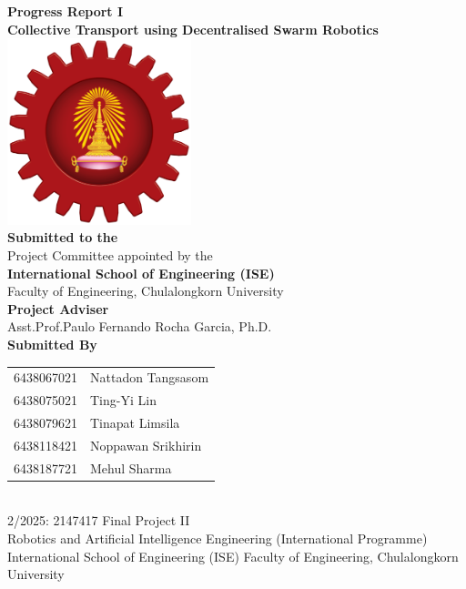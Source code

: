 \begin{titlepage}
    \centering

    {\LARGE \textbf{Progress Report I}}\\[1cm]
    {\Huge \textbf{Collective Transport using Decentralised Swarm Robotics}}\\[1cm]

    \includegraphics[width=0.4\textwidth]{assets/images/ise_logo.png}\\[1cm]
    
    \textbf{Submitted to the}\\[0.1cm]
    Project Committee appointed by the\\
    \textbf{International School of Engineering (ISE)}\\
    Faculty of Engineering, Chulalongkorn University\\[1cm]

    \textbf{Project Adviser}\\[0.1cm]
    Asst.Prof.Paulo Fernando Rocha Garcia, Ph.D.\\[1cm]

    \textbf{Submitted By}\\[0.5cm]
    \begin{tabular}{rl}
        6438067021 & Nattadon Tangsasom \\
        6438075021 & Ting-Yi Lin \\
        6438079621 & Tinapat Limsila \\
        6438118421 & Noppawan Srikhirin \\
        6438187721 & Mehul Sharma \\
    \end{tabular}\\[1cm]
    2/2025: 2147417 Final Project II\\
    Robotics and Artificial Intelligence Engineering (International Programme)\\
    International School of Engineering (ISE) Faculty of Engineering, Chulalongkorn University

\end{titlepage}
